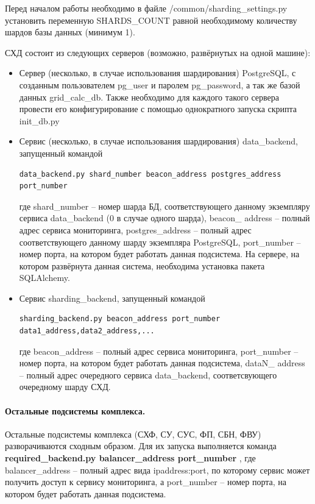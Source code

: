 \documentclass[a4paper,12pt]{report}
\numberwithin{equation}{section}
\begin{document}
  Перед началом работы необходимо в файле /common/sharding\_settings.py установить переменную SHARDS\_COUNT равной необходимому количеству шардов базы данных (минимум 1).
  
  СХД состоит из следующих серверов (возможно, развёрнутых на одной машине):
  \begin{itemize}
    \item Сервер (несколько, в случае использования шардирования) PostgreSQL, с созданным пользователем pg\_user и паролем pg\_password, а так же базой данных grid\_calc\_db. Также необходимо для каждого такого сервера провести его конфигурирование с помощью однократного запуска скрипта init\_db.py
    \item Сервис (несколько, в случае использования шардирования) data\_backend, запущенный командой
    \begin{lstlisting}[numbers=none]
    data_backend.py shard_number beacon_address postgres_address port_number
    \end{lstlisting}
    где shard\_number -- номер шарда БД, соответствующего данному экземпляру сервиса data\_backend (0 в случае одного шарда),
    beacon\_ address -- полный адрес сервиса мониторинга,
    postgres\_address -- полный адрес соответствующего данному шарду экземпляра PostgreSQL, 
    port\_number -- номер порта, на котором будет работать данная подсистема.
    На сервере, на котором развёрнута данная система, необходима установка пакета SQLAlchemy.
    \item Сервис sharding\_backend, запущенный командой
    \begin{lstlisting}[numbers=none]
    sharding_backend.py beacon_address port_number data1_address,data2_address,...
    \end{lstlisting}
    где beacon\_address -- полный адрес сервиса мониторинга,
    port\_number -- номер порта, на котором будет работать данная подсистема,
    dataN\_ address -- полный адрес очередного сервиса data\_backend, соответсвующего очередному шарду СХД.
  \end{itemize}
  
  \paragraph{Остальные подсистемы комплекса.}
  Остальные подсистемы комплекса (СХФ, СУ, СУС, ФП, СБН, ФВУ) разворачиваются сходным образом.
  Для их запуска выполняется команда 
  \textbf{ required\_backend.py balancer\_address port\_number }
  , где balancer\_address -- полный адрес вида ipaddress:port, по которому сервис может получить доступ к сервису мониторинга,
  а port\_number -- номер порта, на котором будет работать данная подсистема.
  
\end{document}
